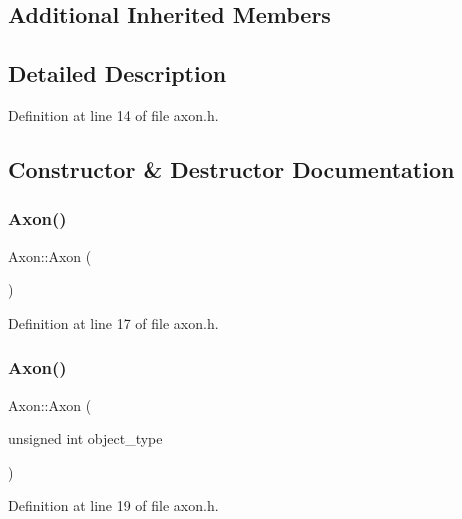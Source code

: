 \subsection*{Additional Inherited Members}


\subsection{Detailed Description}


Definition at line 14 of file axon.\+h.



\subsection{Constructor \& Destructor Documentation}
\mbox{\label{class_axon_a1a0703b026b74c83e418613d929c5d22}} 
\subsubsection{\texorpdfstring{Axon()}{Axon()}\hspace{0.1cm}{\footnotesize\ttfamily [1/4]}}
{\footnotesize\ttfamily Axon\+::\+Axon (\begin{DoxyParamCaption}{ }\end{DoxyParamCaption})\hspace{0.3cm}{\ttfamily [inline]}}



Definition at line 17 of file axon.\+h.

\mbox{\label{class_axon_a7cc05238af77735983111d1ca58c9c9b}} 
\subsubsection{\texorpdfstring{Axon()}{Axon()}\hspace{0.1cm}{\footnotesize\ttfamily [2/4]}}
{\footnotesize\ttfamily Axon\+::\+Axon (\begin{DoxyParamCaption}\item[{unsigned int}]{object\+\_\+type }\end{DoxyParamCaption})\hspace{0.3cm}{\ttfamily [inline]}}



Definition at line 19 of file axon.\+h.

